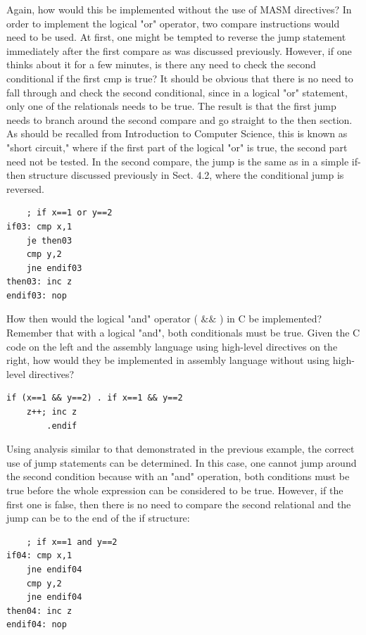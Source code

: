 \documentclass[10pt]{book}
\begin{document}
Again, how would this be implemented without the use of MASM directives? In order to implement the logical "or" operator, two compare instructions would need to be used. At first, one might be tempted to reverse the jump statement immediately after the first compare as was discussed previously. However, if one thinks about it for a few minutes, is there any need to check the second conditional if the first cmp is true? It should be obvious that there is no need to fall through and check the second conditional, since in a logical "or" statement, only one of the relationals needs to be true. The result is that the first jump needs to branch around the second compare and go straight to the then section. As should be recalled from Introduction to Computer Science, this is known as "short circuit," where if the first part of the logical "or" is true, the second part need not be tested. In the second compare, the jump is the same as in a simple if-then structure discussed previously in Sect. 4.2, where the conditional jump is reversed.

\begin{verbatim}
    ; if x==1 or y==2
if03: cmp x,1
    je then03
    cmp y,2
    jne endif03
then03: inc z
endif03: nop
\end{verbatim}

How then would the logical "and" operator ( $\& \&$ ) in C be implemented? Remember that with a logical "and", both conditionals must be true. Given the C code on the left and the assembly language using high-level directives on the right, how would they be implemented in assembly language without using high-level directives?


\begin{verbatim}
if (x==1 && y==2) . if x==1 && y==2
    z++; inc z
        .endif
\end{verbatim}

Using analysis similar to that demonstrated in the previous example, the correct use of jump statements can be determined. In this case, one cannot jump around the second condition because with an "and" operation, both conditions must be true before the whole expression can be considered to be true. However, if the first one is false, then there is no need to compare the second relational and the jump can be to the end of the if structure:

\begin{verbatim}
    ; if x==1 and y==2
if04: cmp x,1
    jne endif04
    cmp y,2
    jne endif04
then04: inc z
endif04: nop
\end{verbatim}
\end{document}
